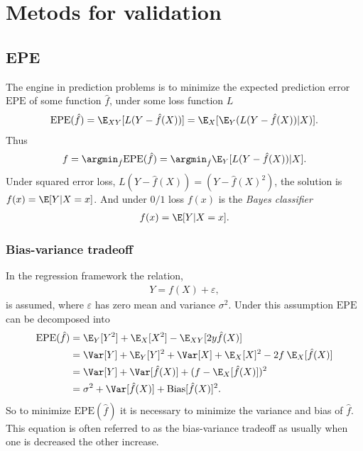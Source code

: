 \chapter{Metods for validation}
\label{chap:Metods for validation}
\section{EPE}
\label{sec:EPE}
The engine in prediction problems is to minimize the expected prediction error $\mathrm{EPE}$ of some function $\hat f$, under some loss function $L$
\begin{align}
  \mathrm{EPE}(\hat f) = \E_{X Y}[L(Y- \hat f(X))] = \E_X [\E_Y (L(Y- \hat f(X))|X)].
\end{align}
Thus 
\begin{align}
  f = \argmin_{\hat f} \mathrm{EPE}(\hat f) = \argmin_{\hat f} \E_Y [L(Y- \hat f(X)) | X ].
\end{align}
Under squared error loss, $L(Y-\hat f(X)) = (Y- \hat f(X)^2)$, the solution is 
$ f(x) = \E[Y | X=x]$. And under $0/1$ loss $ f(x)$ is the \textit{Bayes classifier} 
\begin{align}
  f(x) = \E[Y | X=x].
\end{align}

\subsection{Bias-variance tradeoff}
\label{sub:Bias-variance tradeoff}
In the regression framework the relation,
\begin{align}
  Y = f(X) + \varepsilon,  
\end{align}
is assumed, where $\varepsilon$ has zero mean and variance $\sigma^2$.
Under this assumption $\mathrm{EPE}$ can be decomposed into
\begin{align}
  \mathrm{EPE}(\hat f) &=  \E_Y[Y^2] + \E_X[X^2] - \E_{X Y}[2 y \hat f(X)] \notag \\
                       &= \Var[Y] + \E_Y[Y]^2 + \Var[X] + \E_X[X]^2 - 2 f\: \E_X[\hat f(X)] \notag \\
                       &= \Var[Y] + \Var[\hat f(X)] + (f - \E_X[\hat f(X)])^2 \notag \\
                       &= \sigma^2 + \Var[\hat f(X)] + \mathrm{Bias}[\hat f(X)]^2.
\end{align}
So to minimize $\mathrm{EPE}(\hat f)$ it is necessary to minimize the variance and bias of $\hat f$. This equation is often referred to as the bias-variance tradeoff as usually when one is decreased the other increase. 

